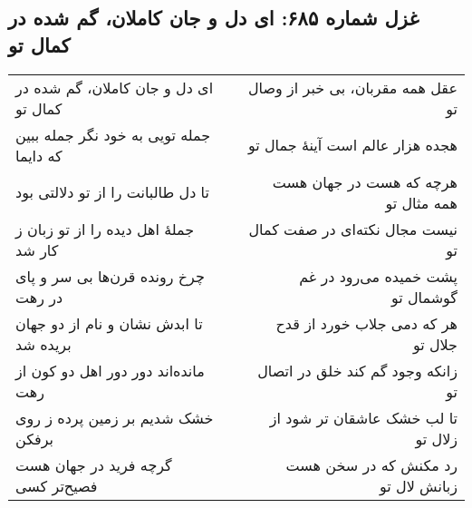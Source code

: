 \begin{center}
\section*{غزل شماره ۶۸۵: ای دل و جان کاملان، گم شده در کمال تو}
\label{sec:685}
\begin{longtable}{l p{0.5cm} r}
ای دل و جان کاملان، گم شده در کمال تو
&&
عقل همه مقربان، بی خبر از وصال تو
\\
جمله تویی به خود نگر جمله ببین که دایما
&&
هجده هزار عالم است آینهٔ جمال تو
\\
تا دل طالبانت را از تو دلالتی بود
&&
هرچه که هست در جهان هست همه مثال تو
\\
جملهٔ اهل دیده را از تو زبان ز کار شد
&&
نیست مجال نکته‌ای در صفت کمال تو
\\
چرخ رونده قرن‌ها بی سر و پای در رهت
&&
پشت خمیده می‌رود در غم گوشمال تو
\\
تا ابدش نشان و نام از دو جهان بریده شد
&&
هر که دمی جلاب خورد از قدح جلال تو
\\
مانده‌اند دور دور اهل دو کون از رهت
&&
زانکه وجود گم کند خلق در اتصال تو
\\
خشک شدیم بر زمین پرده ز روی برفکن
&&
تا لب خشک عاشقان تر شود از زلال تو
\\
گرچه فرید در جهان هست فصیح‌تر کسی
&&
رد مکنش که در سخن هست زبانش لال تو
\\
\end{longtable}
\end{center}
